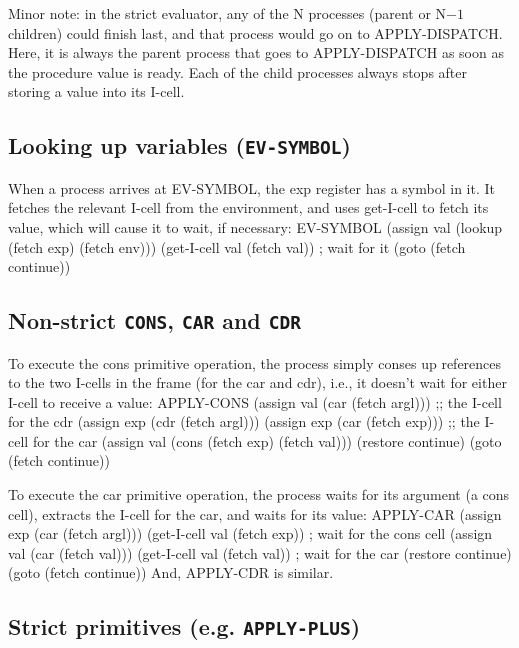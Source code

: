 Minor note: in the strict evaluator, any of the N processes (parent or
N$-1$ children) could finish last, and that process would go on to
{\cf APPLY-DISPATCH}.  Here, it is always the parent process that goes
to {\cf APPLY-DISPATCH} as soon as the procedure value is ready.  Each
of the child processes always stops after storing a value into its
I-cell.

\subsection{Looking up variables ({\tt EV-SYMBOL})}

When a process arrives at {\cf EV-SYMBOL}, the {\cf exp} register has
a symbol in it.  It fetches the relevant I-cell from the environment,
and uses {\cf get-I-cell} to fetch its value, which will cause it to
wait, if necessary:
\beginlisp
EV-SYMBOL
  (assign val (lookup (fetch exp) (fetch env)))
  (get-I-cell val (fetch val))                  ; wait for it
  (goto (fetch continue))
\endlisp

\subsection{Non-strict {\tt CONS}, {\tt CAR} and {\tt CDR}}

To execute the {\cf cons} primitive operation, the process simply conses up
references to the two I-cells in the frame (for the car and cdr), i.e., it
doesn't wait for either I-cell to receive a value:
\beginlisp
APPLY-CONS
  (assign val (car (fetch argl)))        ;; the I-cell for the cdr
  (assign exp (cdr (fetch argl)))
  (assign exp (car (fetch exp)))         ;; the I-cell for the car
\null
  (assign val (cons (fetch exp) (fetch val)))
  (restore continue)
  (goto (fetch continue))
\endlisp

To execute the {\cf car} primitive operation, the process waits for its
argument (a cons cell), extracts the I-cell for the car, and waits for its value:
\beginlisp
APPLY-CAR
  (assign exp (car (fetch argl)))
  (get-I-cell val (fetch exp))      ; wait for the cons cell
\null
  (assign val (car (fetch val)))
  (get-I-cell val (fetch val))      ; wait for the car
\null
  (restore continue)
  (goto (fetch continue))
\endlisp
And, {\cf APPLY-CDR} is similar.

\subsection{Strict primitives (e.g. {\tt APPLY-PLUS})}

